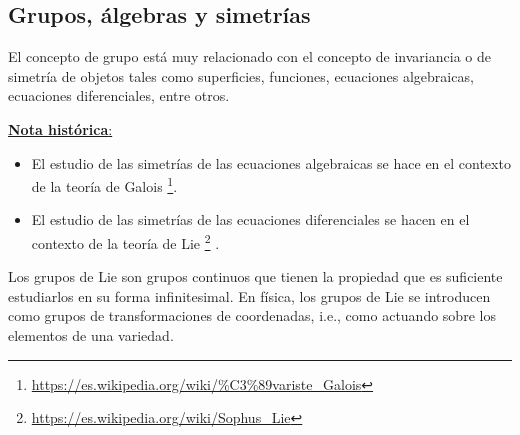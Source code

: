 \subsection{Grupos, álgebras y simetrías}
El concepto de grupo está muy relacionado con el concepto de invariancia o de simetría de objetos tales como superficies, funciones, ecuaciones algebraicas, ecuaciones diferenciales, entre otros.

\underline{\textbf{Nota histórica}: }
\begin{itemize}
	\item El estudio de las simetrías de las ecuaciones algebraicas se hace en el contexto de la teoría de Galois \footnote{\url{https://es.wikipedia.org/wiki/\%C3\%89variste_Galois}}.
	\item El estudio de las simetrías de las ecuaciones diferenciales se hacen en el contexto de la teoría de Lie \footnote{\url{https://es.wikipedia.org/wiki/Sophus_Lie}} .
\end{itemize}

Los grupos de Lie son grupos continuos que tienen la propiedad que es suficiente estudiarlos en su forma infinitesimal. En física, los grupos de Lie se introducen como grupos de transformaciones de coordenadas, i.e., como actuando sobre los elementos de una variedad.

